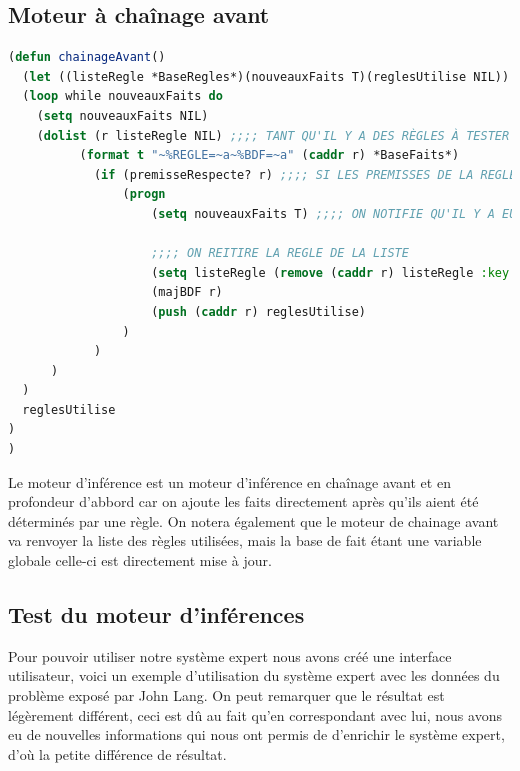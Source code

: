 \documentclass[a4paper,10pt]{report}
\begin{document}
    \newpage
    \subsection{Moteur à chaînage avant}
    
    \begin{lstlisting}[basicstyle = \footnotesize, language=Lisp]
(defun chainageAvant()
  (let ((listeRegle *BaseRegles*)(nouveauxFaits T)(reglesUtilise NIL))
  (loop while nouveauxFaits do
    (setq nouveauxFaits NIL)
    (dolist (r listeRegle NIL) ;;;; TANT QU'IL Y A DES RÈGLES À TESTER
          (format t "~%REGLE=~a~%BDF=~a" (caddr r) *BaseFaits*)
            (if (premisseRespecte? r) ;;;; SI LES PREMISSES DE LA REGLE SONT RESPECTES
                (progn
                    (setq nouveauxFaits T) ;;;; ON NOTIFIE QU'IL Y A EUT UN NOUVEAU FAIT
                    
                    ;;;; ON REITIRE LA REGLE DE LA LISTE
                    (setq listeRegle (remove (caddr r) listeRegle :key #'third))  
                    (majBDF r)
                    (push (caddr r) reglesUtilise)
                )
            )
      )
  )
  reglesUtilise
)
)
    \end{lstlisting}

    Le moteur d'inférence est un moteur d'inférence en chaînage avant et en profondeur d'abbord car on ajoute les faits directement après qu'ils aient été déterminés
    par une règle. On notera également que le moteur de chainage avant va renvoyer la liste des règles utilisées, mais la base de fait étant une variable globale 
    celle-ci est directement mise à jour.
    \newpage
    \subsection{Test du moteur d'inférences}
    
    Pour pouvoir utiliser notre système expert nous avons créé une interface utilisateur, voici un exemple d'utilisation du système expert avec les données du problème
    exposé par John Lang. On peut remarquer que le résultat est légèrement différent, ceci est dû au fait qu'en correspondant avec lui, nous avons eu de nouvelles 
    informations qui nous ont permis de d'enrichir le système expert, d'où la petite différence de résultat.
    
\end{document}

